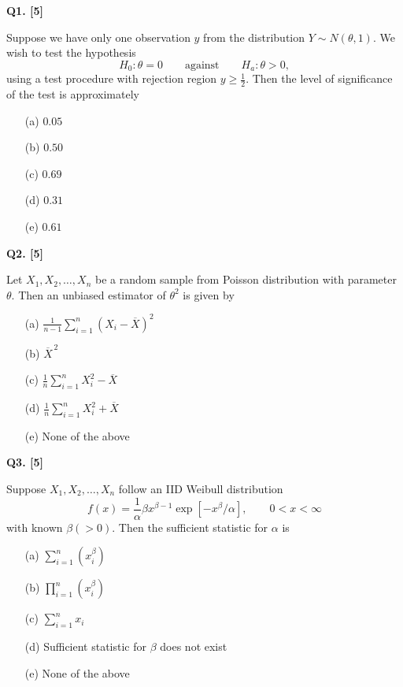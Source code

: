 \documentclass[11pt]{article}
\begin{document}
\medskip
\textbf{Q1. [5]}

Suppose we have only one observation $y$ from the distribution $Y\sim N(\theta,1)$. We wish to test the hypothesis
\[
H_0:\theta=0\qquad\text{against}\qquad H_a:\theta>0,
\]
using a test procedure with rejection region $y\geq\frac12$. Then the level of significance of the test is approximately
\begin{enumerate}
\setlength{\itemsep}{0pt}\setlength{\parsep}{0pt}\setlength{\topsep}{2pt}
\item[(a)] $0.05$
\item[(b)] $0.50$
\item[(c)] $0.69$
\item[(d)] $0.31$
\item[(e)] $0.61$
\end{enumerate}

\medskip
\textbf{Q2. [5]}

Let $X_1,X_2,\ldots,X_n$ be a random sample from Poisson distribution with parameter $\theta$. Then an unbiased estimator of $\theta^2$ is given by
\begin{enumerate}
\setlength{\itemsep}{0pt}\setlength{\parsep}{0pt}\setlength{\topsep}{2pt}
\item[(a)] $\displaystyle\frac{1}{n-1}\sum_{i=1}^{n}(X_i-\overline{X})^2$
\item[(b)] $\overline{X}^{\,2}$
\item[(c)] $\displaystyle\frac{1}{n}\sum_{i=1}^{n}X_i^2-\overline{X}$
\item[(d)] $\displaystyle\frac{1}{n}\sum_{i=1}^{n}X_i^2+\overline{X}$
\item[(e)] None of the above
\end{enumerate}

\medskip
\textbf{Q3. [5]}

Suppose $X_1,X_2,\ldots,X_n$ follow an IID Weibull distribution
\[
f(x)=\frac{1}{\alpha}\beta x^{\beta-1}\exp[-x^{\beta}/\alpha],\qquad 0<x<\infty
\]
with known $\beta(>0)$. Then the sufficient statistic for $\alpha$ is
\begin{enumerate}
\setlength{\itemsep}{0pt}\setlength{\parsep}{0pt}\setlength{\topsep}{2pt}
\item[(a)] $\displaystyle\sum_{i=1}^{n}(x_i^{\beta})$
\item[(b)] $\displaystyle\prod_{i=1}^{n}(x_i^{\beta})$
\item[(c)] $\displaystyle\sum_{i=1}^{n}x_i$
\item[(d)] Sufficient statistic for $\beta$ does not exist
\item[(e)] None of the above
\end{enumerate}
\endgroup
\end{document}
